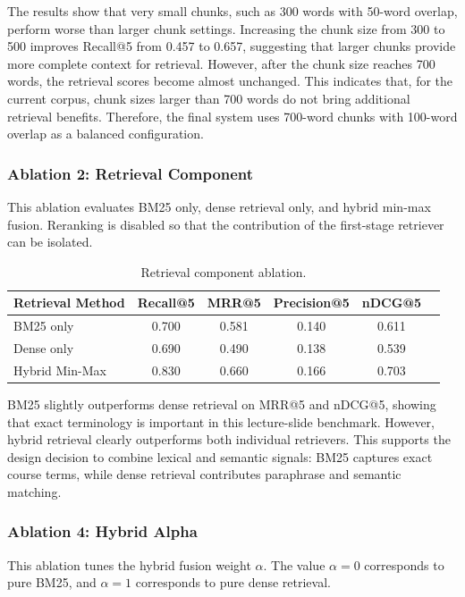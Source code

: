 \documentclass[11pt,a4paper]{article}
\begin{document}
The results show that very small chunks, such as 300 words with 50-word overlap,
perform worse than larger chunk settings. Increasing the chunk size from 300 to
500 improves Recall@5 from 0.457 to 0.657, suggesting that larger chunks provide
more complete context for retrieval. However, after the chunk size reaches 700
words, the retrieval scores become almost unchanged. This indicates that, for
the current corpus, chunk sizes larger than 700 words do not bring additional
retrieval benefits. Therefore, the final system uses 700-word chunks with
100-word overlap as a balanced configuration.


\subsubsection{Ablation 2: Retrieval Component}

This ablation evaluates BM25 only, dense retrieval only, and hybrid min-max
fusion. Reranking is disabled so that the contribution of the first-stage
retriever can be isolated.

\begin{table}[H]
\centering
\caption{Retrieval component ablation.}
\label{tab:retrieval-component}
\begin{tabular}{lccccc}
\toprule
Retrieval Method & Recall@5 & MRR@5 & Precision@5 & nDCG@5 \\
\midrule
BM25 only & 0.700 & 0.581 & 0.140 & 0.611 \\
Dense only & 0.690 & 0.490 & 0.138 & 0.539 \\
Hybrid Min-Max & 0.830 & 0.660 & 0.166 & 0.703 \\
\bottomrule
\end{tabular}
\end{table}

BM25 slightly outperforms dense retrieval on MRR@5 and nDCG@5, showing that
exact terminology is important in this lecture-slide benchmark. However, hybrid
retrieval clearly outperforms both individual retrievers. This supports the
design decision to combine lexical and semantic signals: BM25 captures exact
course terms, while dense retrieval contributes paraphrase and semantic
matching.

\subsubsection{Ablation 4: Hybrid Alpha}

This ablation tunes the hybrid fusion weight $\alpha$. The value $\alpha=0$
corresponds to pure BM25, and $\alpha=1$ corresponds to pure dense retrieval.
\end{document}
